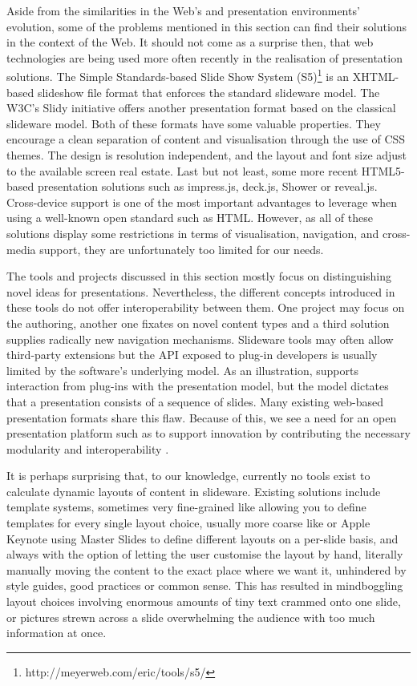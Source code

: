   Aside from the similarities in the Web's and presentation environments'
   evolution, some of the problems mentioned in this section can find their
   solutions in the context of the Web. It should not come as a surprise then,
   that web technologies are being used more often recently in the realisation
   of presentation solutions. The Simple Standards-based Slide Show System
   (S5)\footnote{http://meyerweb.com/eric/tools/s5/} is an XHTML-based
   slideshow file format that enforces the standard slideware model. The W3C's
   Slidy \citep{raggett-1} initiative offers another presentation format based
   on the classical slideware model. Both of these formats have some valuable
   properties. They encourage a clean separation of content and visualisation
   through the use of CSS themes. The design is resolution independent, and the
   layout and font size adjust to the available screen real estate. Last but
   not least, some more recent HTML5-based presentation solutions such as
   impress.js, deck.js, Shower or reveal.js. Cross-device support is one of the
   most important advantages to leverage when using a well-known open standard
   such as HTML. However, as all of these solutions display some restrictions
   in terms of visualisation, navigation, and cross-media support, they are
   unfortunately too limited for our needs.

   The tools and projects discussed in this section mostly focus on
   distinguishing novel ideas for presentations. Nevertheless, the different
   concepts introduced in these tools do not offer interoperability between
   them. One project may focus on the authoring, another one fixates on novel
   content types and a third solution supplies radically new navigation
   mechanisms. Slideware tools may often allow third-party extensions but the
   API exposed to plug-in developers is usually limited by the software's
   underlying model. As an illustration, \ppt supports interaction from
   plug-ins with the presentation model, but the model dictates that a
   presentation consists of a sequence of slides. Many existing web-based
   presentation formats share this flaw. Because of this, we see a need for an
   open presentation platform such as \mxp to support innovation by
   contributing the necessary modularity and interoperability \citep{bush-1}.

   It is perhaps surprising that, to our knowledge, currently no tools exist to
   calculate dynamic layouts of content in slideware. Existing solutions
   include template systems, sometimes very fine-grained like \latex allowing
   you to define templates for every single layout choice, usually more coarse
   like \ppt* or Apple Keynote using Master Slides to define different layouts
   on a per-slide basis, and always with the option of letting the user
   customise the layout by hand, literally manually moving the content to the
   exact place where we want it, unhindered by style guides, good practices or
   common sense. This has resulted in mindboggling layout choices involving
   enormous amounts of tiny text crammed onto one slide, or pictures strewn
   across a slide overwhelming the audience with too much information at once.

